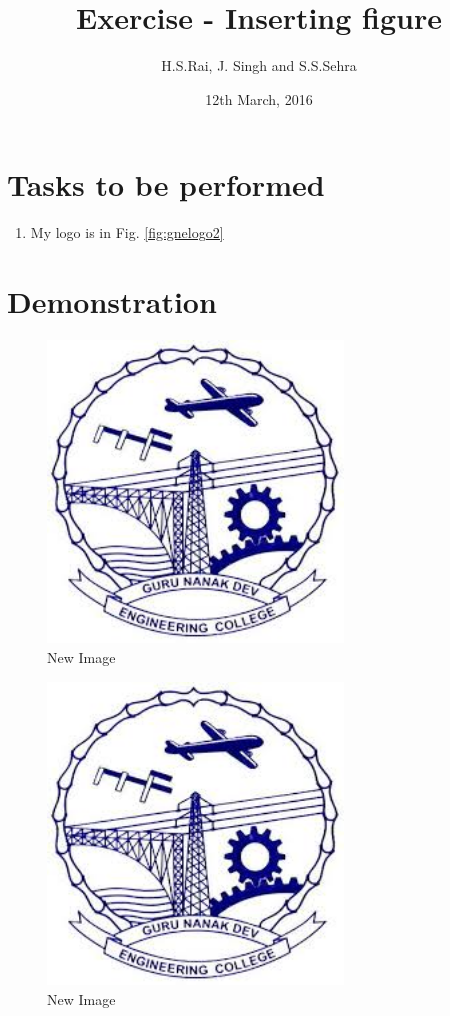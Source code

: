 \documentclass{report}
\title{Exercise - Inserting figure}
\author{H.S.Rai, J. Singh and S.S.Sehra}
\date{12th March, 2016}
\begin{document}
\maketitle	
\listoffigures
\section*{Tasks to be performed}
\begin{enumerate}	
\item My logo is in Fig. \ref{fig:gnelogo2}
\end{enumerate}
\section*{Demonstration}
\begin{figure}
\centering
\includegraphics[width=0.7\textwidth]{../../images/gnelogo}
\caption{New Image}

\label{fig:gnelogo}
\end{figure}
\begin{figure}
\centering
\includegraphics[width=0.7\textwidth]{../../images/gnelogo}
\caption{New Image}
\label{fig:gnelogo1}
\end{figure}
\end{document}
